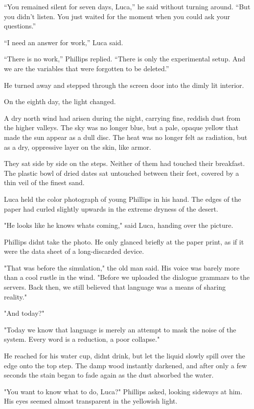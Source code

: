 \documentclass[
  ngerman,
]{article}
\begin{document}
``You remained silent for seven days, Luca,'' he said without turning
around. ``But you didn't listen. You just waited for the moment when you
could ask your questions.''

``I need an answer for work,'' Luca said.

``There is no work,'' Phillips replied. ``There is only the experimental
setup. And we are the variables that were forgotten to be deleted.''

He turned away and stepped through the screen door into the dimly lit
interior.

On the eighth day, the light changed.

A dry north wind had arisen during the night, carrying fine, reddish
dust from the higher valleys. The sky was no longer blue, but a pale,
opaque yellow that made the sun appear as a dull disc. The heat was no
longer felt as radiation, but as a dry, oppressive layer on the skin,
like armor.

They sat side by side on the steps. Neither of them had touched their
breakfast. The plastic bowl of dried dates sat untouched between their
feet, covered by a thin veil of the finest sand.

Luca held the color photograph of young Phillips in his hand. The edges
of the paper had curled slightly upwards in the extreme dryness of the
desert.

"He looks like he knows what\textquotesingle s coming," said Luca,
handing over the picture.

Phillips didn\textquotesingle t take the photo. He only glanced briefly
at the paper print, as if it were the data sheet of a long-discarded
device.

"That was before the simulation," the old man said. His voice was barely
more than a cool rustle in the wind. "Before we uploaded the dialogue
grammars to the servers. Back then, we still believed that language was
a means of sharing reality."

"And today?"

"Today we know that language is merely an attempt to mask the noise of
the system. Every word is a reduction, a poor collapse."

He reached for his water cup, didn\textquotesingle t drink, but let the
liquid slowly spill over the edge onto the top step. The damp wood
instantly darkened, and after only a few seconds the stain began to fade
again as the dust absorbed the water.

"You want to know what to do, Luca?" Phillips asked, looking sideways at
him. His eyes seemed almost transparent in the yellowish light.
\end{document}
